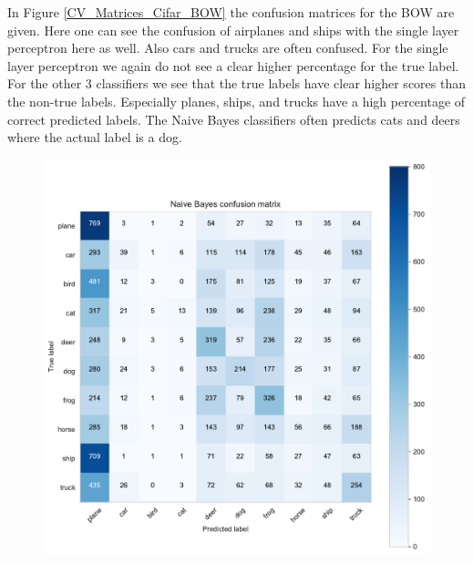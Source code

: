 \documentclass[11pt]{article}
\begin{document}
In Figure \ref{CV_Matrices_Cifar_BOW} the confusion matrices for the BOW are given. Here one can see the confusion of airplanes and ships with the single layer perceptron here as well. Also cars and trucks are often confused. For the single layer perceptron we again do not see a clear higher percentage for the true label. For the other 3 classifiers we see that the true labels have clear higher scores than the non-true labels. Especially planes, ships, and trucks have a high percentage of correct predicted labels. The Naive Bayes classifiers often predicts cats and deers where the actual label is a dog.  

\begin{figure}[H]
\begin{minipage}[c]{0.5\textwidth}
\includegraphics[width=1\linewidth]{figures/Cifar/CM__NB_color_hist.pdf}
\end{minipage}
\begin{minipage}[c]{0.5\textwidth}

\end{minipage}
\end{figure}
\end{document}
